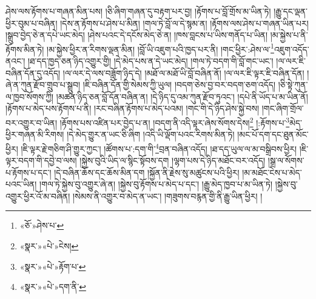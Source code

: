 ཤེས་ལས་རྟོགས་པ་གཞན་མིན་པས། །ཅི་ཞིག་གཞན་དུ་བརྟག་པར་བྱ། །རྟོགས་པ་བློ་གྲོས་མ་ཡིན་ཏེ། །རྒྱུ་དང་ལྡན་ཕྱིར་བུམ་པ་བཞིན། །དེས་ན་རྟོགས་པ་ཤེས་པ་མིན། །གལ་ཏེ་བློ་ལ་དེ་སྙམ་ན། །རྟོགས་ལས་ཤེས་པ་གཞན་ཡིན་པར། །སྒྲུབ་བྱེད་ཅེ་ན་དཔེ་ཡང་མེད། །ཤེས་པའང་དེ་དངོས་མེད་ཅེ་ན། །ཁས་བླངས་པ་ཡིས་གནོད་པ་ཡིན། །མ་སྐྱེས་པ་ནི་རྟོགས་མིན་ཏེ། །མ་སྐྱེས་ཕྱིར་ན་རིགས་ལྡན་མིན། །བློ་ཡི་འཇུག་པའི་ཁྱད་པར་ནི། །གང་ཕྱིར་:ཤེས་ལ་\footnote{«ཅོ་»ཤེས་པ་}འཇུག་འདོད་ནའང་། །ཐ་དད་ཁྱད་ཅན་ཉིད་འགྱུར་གྱི། །དེ་མེད་པས་ན་དེ་ཡང་མེད། །གལ་ཏེ་བདག་གི་བློ་གང་ཡང་། །ལ་ལར་ཇི་བཞིན་དོན་དུ་འདོད། །ལ་ལར་དེ་ལས་བཟློག་ཉིད་དེ། །མཐོ་ལ་མཐོ་ཡི་བློ་བཞིན་ནོ། །ལ་ལར་ཇི་ལྟར་ཇི་བཞིན་དོན། །ཞེ་ན་ཀུན་རྫོབ་གྲུབ་པ་སྒྲུབ། །ཇི་བཞིན་དོན་གྱི་སེམས་ཀྱི་ཡུལ། །བདག་ཅེས་བྱ་བར་བདག་ཅག་འདོད། །ཅི་སྟེ་ཀུན་ལ་ཁྱབ་སོགས་ཀྱི། །མཚན་ཉིད་ཅན་བློ་དོན་བཞིན་ན། །དེ་ཉིད་དུ་འམ་ཀུན་རྫོབ་ཏུའང་། །དཔེ་ནི་ཡོད་པ་མ་ཡིན་ནོ། །རྟོགས་པ་མེད་པས་རྟོགས་པ་ནི། །རང་བཞིན་རྟོགས་པ་མེད་པའམ། །གང་གི་དེ་ཉིད་ཤེས་སྐྱེ་བས། །གང་ཞིག་གྲོལ་བར་འགྱུར་བ་ཡིན། །རྟོགས་པས་འཛིན་པར་བྱེད་པ་ན། །བདག་ནི་འདི་ལྟར་ཞེས་སོགས་དེས།\footnote{«སྣར་»«པེ་»ངེས།} །:རྟོགས་པ་\footnote{«སྣར་»«པེ་»རྟོག་པ་}མེད་ཕྱིར་གཞན་མི་རིགས། །དེ་མེད་གྱུར་ན་ཡང་ཅི་ཞིག །འདི་ཡི་ལྡོག་པའང་རིགས་མིན་ཏེ། །མང་པོ་དག་དང་ཐུན་མོང་ཕྱིར། །ཇི་ལྟར་རྗེ་གཅིག་ཤི་གྱུར་ཀྱང་། །ཚོགས་པ་:དག་གི་\footnote{«སྣར་»«པེ་»དག་ནི་}བྲན་བཞིན་འདོད། །ཐ་དད་ཡུལ་ལ་མ་བསྒྲིབས་ཕྱིར། །ཇི་ལྟར་བདག་གི་དབྱེ་བ་ལས། །སྐྱེས་བུའི་ཡིད་ལ་སྙིང་སྟོབས་དག །ལྷག་པས་དེ་ཉིད་མཐོང་བར་འདོད། །སྒྲ་ལ་སོགས་པ་རྟོགས་པ་དང་། །དེ་བཞིན་ཆོས་དང་ཆོས་མིན་དག །སྐྱོན་ནི་རྗེས་སུ་མཚུངས་པའི་ཕྱིར། །མ་མཐོང་ངེས་པ་མེད་པའང་ཡིན། །གལ་ཏེ་སྐྱེས་བུ་འགྱུར་ཞེ་ན། །སྐྱེས་བུ་རྟོགས་པ་མེད་པ་དང་། །རྒྱུ་མེད་ཁྱབ་པ་མ་ཡིན་ཏེ། །སྐྱེས་བུ་འགྱུར་ཕྱིར་འོ་མ་བཞིན། །སེམས་ནི་འགྱུར་བ་མེད་ན་ཡང་། །གཟུགས་བརྙན་གྱི་ནི་རྒྱུ་ཡིན་ཕྱིར། །

